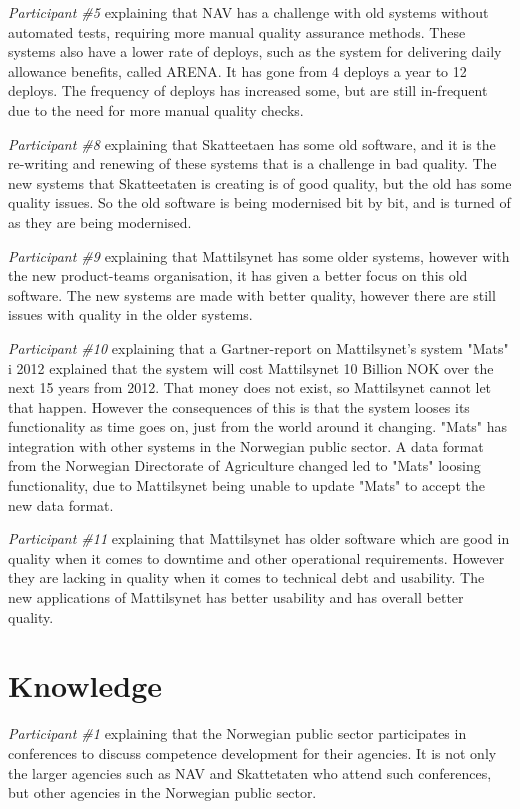 \textit{Participant \#5} explaining that NAV has a challenge with old systems without automated tests, requiring more manual quality assurance methods. These systems also have a lower rate of deploys, such as the system for delivering daily allowance benefits, called ARENA. It has gone from 4 deploys a year to 12 deploys. The frequency of deploys has increased some, but are still in-frequent due to the need for more manual quality checks.

\textit{Participant \#8} explaining that Skatteetaen has some old software, and it is the re-writing and renewing of these systems that is a challenge in bad quality. The new systems that Skatteetaten is creating is of good quality, but the old has some quality issues. So the old software is being modernised bit by bit, and is turned of as they are being modernised.  

\textit{Participant \#9} explaining that Mattilsynet has some older systems, however with the new product-teams organisation, it has given a better focus on this old software. The new systems are made with better quality, however there are still issues with quality in the older systems.

\textit{Participant \#10} explaining that a Gartner-report on Mattilsynet's system "Mats" i 2012 explained that the system will cost Mattilsynet 10 Billion NOK over the next 15 years from 2012. That money does not exist, so Mattilsynet cannot let that happen. However the consequences of this is that the system looses its functionality as time goes on, just from the world around it changing. "Mats" has integration with other systems in the Norwegian public sector. A data format from the Norwegian Directorate of Agriculture changed led to "Mats" loosing functionality, due to Mattilsynet being unable to update "Mats" to accept the new data format.

\textit{Participant \#11} explaining that Mattilsynet has older software which are good in quality when it comes to downtime and other operational requirements. However they are lacking in quality when it comes to technical debt and usability. The new applications of Mattilsynet has better usability and has overall better quality.

\section{Knowledge}
\textit{Participant \#1} explaining that the Norwegian public sector participates in conferences to discuss competence development for their agencies. It is not only the larger agencies such as NAV and Skattetaten who attend such conferences, but other agencies in the Norwegian public sector.

